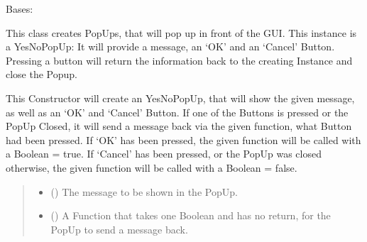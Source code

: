 \documentclass[letterpaper,10pt,english]{sphinxmanual}
\begin{document}
\begin{fulllineitems}
\label{\detokenize{apidoc/src.osm_configurator.view.popups:src.osm_configurator.view.popups.yes_no_pop_up.YesNoPopUp}}
\pysigstartsignatures
{}
\pysigstopsignatures
\sphinxAtStartPar
Bases: 

\sphinxAtStartPar
This class creates PopUps, that will pop up in front of the GUI.
This instance is a YesNoPopUp: It will provide a message, an ‘OK’ and an ‘Cancel’ Button.
Pressing a button will return the information back to the creating Instance and close the Popup.

\begin{fulllineitems}
\label{\detokenize{apidoc/src.osm_configurator.view.popups:src.osm_configurator.view.popups.yes_no_pop_up.YesNoPopUp.__init__}}
\pysigstartsignatures
{}
\pysigstopsignatures
\sphinxAtStartPar
This Constructor will create an YesNoPopUp, that will show the given message, as well as an ‘OK’ and
‘Cancel’ Button. If one of the Buttons is pressed or the PopUp Closed, it will send a message back via the
given function, what Button had been pressed.
If ‘OK’ has been pressed, the given function will be called with a Boolean = true.
If ‘Cancel’ has been pressed, or the PopUp was closed otherwise, the given function will be called with
a Boolean = false.
\begin{quote}\begin{description}
\begin{itemize}
\item {} 
\sphinxAtStartPar
{} () \textendash{} The message to be shown in the PopUp.

\item {} 
\sphinxAtStartPar
{} () \textendash{} A Function that takes one Boolean and has no return, for the PopUp to send a message back.

\end{itemize}

\end{description}\end{quote}

\end{fulllineitems}


\end{fulllineitems}
\end{document}
